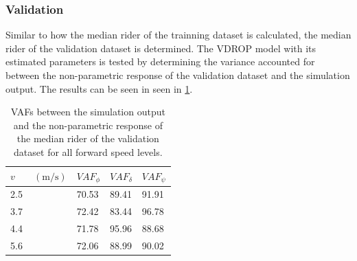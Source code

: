 \subsubsection{Validation}
Similar to how the median rider of the trainning dataset is calculated, the median rider of the validation dataset is determined. The VDROP model with its estimated parameters is tested by determining the variance accounted for between the non-parametric response of the  validation dataset and the simulation output. The results can be seen in seen in \cref{tb:validation}.
\begin{table}[!h]
  
    \centering
    \caption{VAFs between the simulation output and the non-parametric response of the median rider of the validation dataset for all forward speed levels.}
    \begin{tabular}{l|lll}
        \label{tb:validation}
    $v\;\;\;\;\;\;\; (\si{\meter\per\second})$ & $\mathit{VAF}_\phi$ & $\mathit{VAF}_\delta$ & $\mathit{VAF}_\psi$ \\ \hline
    2.5                        & 70.53               & 89.41                 & 91.91               \\
    3.7                        & 72.42               & 83.44                 & 96.78               \\
    4.4                        & 71.78               & 95.96                 & 88.68               \\
    5.6                        & 72.06               & 88.99                 & 90.02              
    \end{tabular}
    \end{table}

